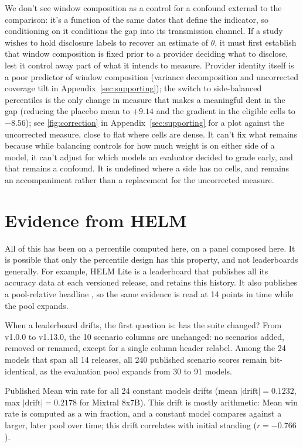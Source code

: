 \documentclass{article}
\begin{document}
We don't see window composition as a control for a confound external to the comparison: it's a function of the same dates that define the indicator, so conditioning on it conditions the gap into its transmission channel. If a study wishes to hold disclosure labels to recover an estimate of $\theta$, it must first establish that window composition is fixed prior to a provider deciding what to disclose, lest it control away part of what it intends to measure. Provider identity itself is a poor predictor of window composition (variance decomposition and uncorrected coverage tilt in Appendix~\ref{sec:supporting}); the switch to side-balanced percentiles is the only change in measure that makes a meaningful dent in the gap (reducing the placebo mean to $+9.14$ and the gradient in the eligible cells to $-8.56$); see \autoref{fig:correction} in Appendix~\ref{sec:supporting} for a plot against the uncorrected measure, close to flat where cells are dense. It can't fix what remains because while balancing controls for how much weight is on either side of a model, it can't adjust for which models an evaluator decided to grade early, and that remains a confound. It is undefined where a side has no cells, and remains an accompaniment rather than a replacement for the uncorrected measure.
\section{Evidence from HELM}\label{sec:external}

All of this has been on a percentile computed here, on a panel composed here. It is possible that only the percentile design has this property, and not leaderboards generally. For example, HELM Lite is a leaderboard that publishes all its accuracy data at each versioned release, and retains this history. It also publishes a pool-relative headline \citep{liang2022helm}, so the same evidence is read at 14 points in time while the pool expands.

When a leaderboard drifts, the first question is: has the suite changed? From v1.0.0 to v1.13.0, the 10 scenario columns are unchanged: no scenarios added, removed or renamed, except for a single column header relabel. Among the 24 models that span all 14 releases, all 240 published scenario scores remain bit-identical, as the evaluation pool expands from 30 to 91 models.

Published Mean win rate for all 24 constant models drifts (mean $|\text{drift}| = 0.1232$, max $|\text{drift}| = 0.2178$ for Mixtral 8x7B). This drift is mostly arithmetic: Mean win rate is computed as a win fraction, and a constant model compares against a larger, later pool over time; this drift correlates with initial standing ($r = -0.766$).
\end{document}
